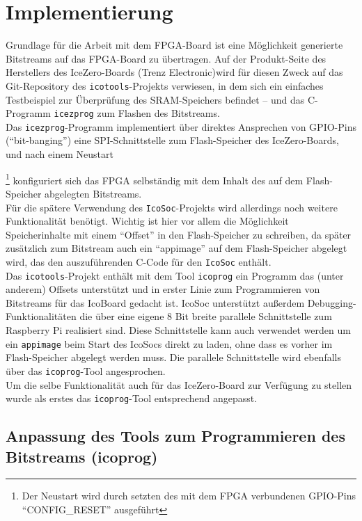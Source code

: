 \chapter{Implementierung}
\label{ch:Implementierung}

Grundlage für die Arbeit mit dem FPGA-Board ist eine Möglichkeit generierte Bitstreams auf das FPGA-Board zu übertragen.
Auf der Produkt-Seite des Herstellers des IceZero-Boards (Trenz Electronic)\cite{web:trenz_icezero}wird für diesen Zweck auf das Git-Repository des {\tt icotools}-Projekts verwiesen, in dem sich ein einfaches Testbeispiel zur Überprüfung des SRAM-Speichers befindet -- und das C-Programm {\tt icezprog} zum Flashen des Bitstreams.\\
Das {\tt icezprog}-Programm implementiert über direktes Ansprechen von GPIO-Pins (``bit-banging'') eine SPI-Schnittstelle zum Flash-Speicher des IceZero-Boards, und nach einem Neustart{\footnote{Der Neustart wird durch setzten des mit dem FPGA verbundenen GPIO-Pins ``CONFIG\_RESET'' ausgeführt} konfiguriert sich das FPGA selbständig mit dem Inhalt des auf dem Flash-Speicher abgelegten Bitstreams.\\
Für die spätere Verwendung des {\tt IcoSoc}-Projekts wird allerdings noch weitere Funktionalität benötigt. Wichtig ist hier vor allem die Möglichkeit Speicherinhalte mit einem ``Offset'' in den Flash-Speicher zu schreiben, da später zusätzlich zum Bitstream auch ein ``appimage'' auf dem Flash-Speicher abgelegt wird, das den auszuführenden C-Code für den {\tt IcoSoc} enthält.\\
Das {\tt icotools}-Projekt enthält mit dem Tool {\tt icoprog} ein Programm das (unter anderem) Offsets unterstützt und in erster Linie zum Programmieren von Bitstreams für das IcoBoard gedacht ist. IcoSoc unterstützt außerdem Debugging-Funktionalitäten die über eine eigene 8 Bit breite parallele Schnittstelle zum Raspberry Pi realisiert sind. Diese Schnittstelle kann auch verwendet werden um ein {\tt appimage} beim Start des IcoSocs direkt zu laden, ohne dass es vorher im Flash-Speicher abgelegt werden muss. Die parallele Schnittstelle wird ebenfalls über das {\tt icoprog}-Tool angesprochen.\\
Um die selbe Funktionalität auch für das IceZero-Board zur Verfügung zu stellen wurde als erstes das {\tt icoprog}-Tool entsprechend angepasst. 

\section{Anpassung des Tools zum Programmieren des Bitstreams (icoprog)}
\label{ch:Implementierung:sec:icoprog}

}
